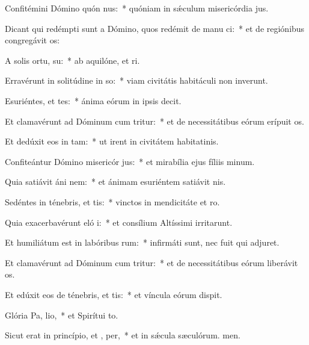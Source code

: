 \item Confitémini Dómino quón nus:~* quóniam in sǽculum misericórdia jus.
\item Dicant qui redémpti sunt a Dómino, quos redémit de manu ci:~* et de regiónibus congregávit os:
\item A solis ortu,  su:~* ab aquilóne, et ri.
\item Erravérunt in solitúdine in so:~* viam civitátis habitáculi non inverunt.
\item Esuriéntes, et tes:~* ánima eórum in ipsis decit.
\item Et clamavérunt ad Dóminum cum tritur:~* et de necessitátibus eórum erípuit os.
\item Et dedúxit eos in  tam:~* ut irent in civitátem habitatinis.
\item Confiteántur Dómino misericór jus:~* et mirabília ejus fíliis minum.
\item Quia satiávit áni nem:~* et ánimam esuriéntem satiávit nis.
\item Sedéntes in ténebris, et  tis:~* vinctos in mendicitáte et ro.
\item Quia exacerbavérunt eló i:~* et consílium Altíssimi irritarunt.
\item Et humiliátum est in labóribus  rum:~* infirmáti sunt, nec fuit qui adjuret.
\item Et clamavérunt ad Dóminum cum tritur:~* et de necessitátibus eórum liberávit os.
\item Et edúxit eos de ténebris, et  tis:~* et víncula eórum dispit.
\item Glória Pa,  lio,~* et Spirítui to.
\item Sicut erat in princípio, et ,  per,~* et in sǽcula sæculórum. men.
